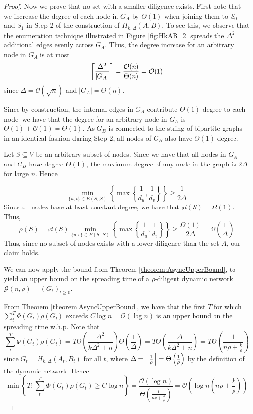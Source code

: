 \begin{proof}
	Now we prove that no set with a smaller diligence exists. First note that we increase the degree of each node in $G_A$ by $\Theta(1)$ when joining them to $S_0$ and $S_1$ in Step 2 of the construction of $H_{k, \Delta}(A,B)$. To see this, we observe that the enumeration technique illustrated in Figure \ref{fig:HkAB_2} spreads the $\Delta^2$ additional edges evenly across $G_A$. Thus, the degree increase for an arbitrary node in $G_A$ is at most
	$$
		\ceil*{\frac{\Delta^2}{|G_A|}}=\frac{\mathcal{O}(n)}{\Theta(n)} = \mathcal{O}(1)
	$$
	since $\Delta = \mathcal{O}(\sqrt{n})$ and $|G_A| = \Theta(n)$. 
	
	Since by construction, the internal edges in $G_A$ contribute $\Theta(1)$ degree to each node, we have that the degree for an arbitrary node in $G_A$ is $\Theta(1) + \mathcal{O}(1) = \Theta(1)$. As $G_B$ is connected to the string of bipartite graphs in an identical fashion during Step 2, all nodes of $G_B$ also have $\Theta(1)$ degree.  
	
	Let $S \subseteq V$ be an arbitrary subset of nodes. Since we have that all nodes in $G_A$ and $G_B$ have degree $\Theta(1)$, the maximum degree of any node in the graph is $2\Delta$ for large $n$. Hence 

	$$
	\min_{\{u, v\} \in E(S, \comp{S}) } \left\{ \max \left\{ \frac{1}{d_u},\frac{1}{d_v} \right\} \right\} \geq \frac{1}{2\Delta}
	$$
	Since all nodes have at least constant degree, we have that $\comp{d}(S) = \Omega(1)$. Thus, 
	$$
		\rho(S) 
		= \comp{d}(S) \min_{\{u, v\} \in E(S, \comp{S}) } \left\{ \max \left\{ \frac{1}{d_u},\frac{1}{d_v} \right\} \right\}
		\geq \frac{\Omega(1)}{2\Delta}
		= \Omega\left(\frac{1}{\Delta}\right)
	$$
	Thus, since no subset of nodes exists with a lower diligence than the set $A$, our claim holds.

	We can now apply the bound from Theorem \ref{theorem:AsyncUpperBound}, to yield an upper bound on the spreading time of a $\rho$-diligent dynamic network $\mathcal{G}(n, \rho) = (G_t)_{t\geq 0}$. 
	
	From Theorem \ref{theorem:AsyncUpperBound}, we have that the first $T$ for which $\sum_t^T \Phi(G_t)\rho(G_t)$ exceeds $C \log n = \mathcal{O}(\log n)$ is an upper bound on the spreading time w.h.p.  Note that 
	$$
		\sum_t^T \Phi(G_t)\rho(G_t)
		= 
		T \Theta\left(\frac{\Delta^2}{k\Delta^2 +n }\right) \Theta\left(\frac{1}{\Delta}\right)
		= 
		T \Theta\left(\frac{\Delta}{k\Delta^2 +n }\right)
		= 
		T \Theta\left(\frac{1}{n \rho + \frac{k}{\rho}}\right)
	$$
	since $G_t = H_{k, \Delta}(A_t,B_t)$ for all $t$, where $\Delta = \ceil*{\frac{1}{\rho}} = \Theta\left(\frac{1}{\rho}\right)$ by the definition of the dynamic network. Hence 
	$$
		\min \left\{T : \sum_t^T \Phi(G_t)\rho(G_t) \geq C \log n \right\}
		=
		\frac{\mathcal{O}(\log n)}{\Theta\left(\frac{1}{n \rho + \frac{k}{\rho}}\right)}
		= 
		\mathcal{O}\left(\log n \left(n \rho + \frac{k}{\rho}\right)\right)
	$$
\end{proof}

